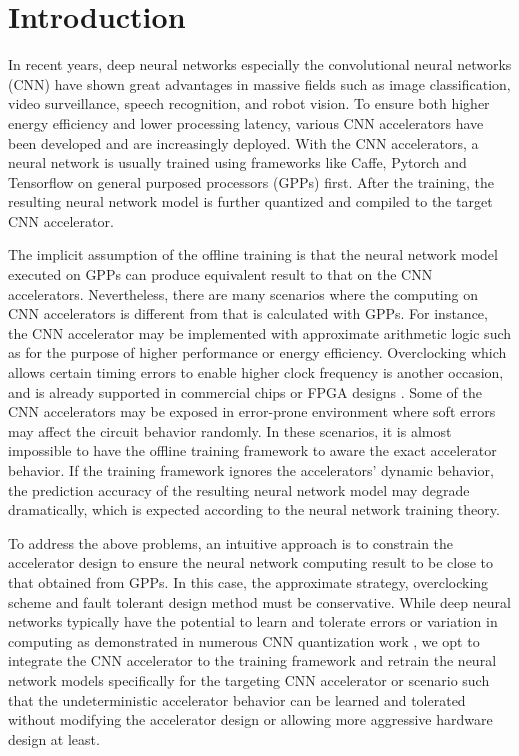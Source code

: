 \section{Introduction} \label{sec:intro}
In recent years, deep neural networks especially the convolutional neural networks (CNN) 
have shown great advantages in massive fields such as image classification, 
video surveillance, speech recognition, and robot vision. To ensure both 
higher energy efficiency and lower processing latency, various CNN accelerators 
\cite{pipecnn_2,Zhang2015_9,Qiu2016_10,deepburing_12,Farabet2010_13,Zeng2018_18} 
have been developed and are increasingly deployed. 
With the CNN accelerators, a neural network is usually trained 
using frameworks like Caffe, Pytorch and Tensorflow on general purposed 
processors (GPPs) first. After the training, the resulting neural network 
model is further quantized and compiled to the target CNN accelerator. 

The implicit assumption of the offline training is that the neural 
network model executed on GPPs can produce equivalent result to 
that on the CNN accelerators. Nevertheless, there are 
many scenarios where the computing on CNN accelerators 
is different from that is calculated with GPPs. For instance, the 
CNN accelerator may be implemented with approximate arithmetic logic 
such as \cite{Approximate_Multiplier_31,Approximate_32,approximate_33} for 
the purpose of higher performance or energy efficiency. 
Overclocking  \cite{overclock_3,Paceline_15,overclock_35} which allows certain 
timing errors to enable higher clock frequency
is another occasion, and is already supported in commercial chips 
or FPGA designs \cite{overclock_retain_34,overclock_Algorithm_36}. Some of the CNN accelerators may be 
exposed in error-prone environment where soft errors 
may affect the circuit behavior randomly. 
In these scenarios, it is almost impossible to have the offline training 
framework to aware the exact accelerator behavior. 
If the training framework ignores the accelerators’ dynamic 
behavior, the prediction accuracy of the resulting neural 
network model may degrade dramatically, which is expected according to 
the neural network training theory.

To address the above problems, an intuitive approach is to 
constrain the accelerator design to ensure the neural 
network computing result to be close to that obtained from GPPs. 
In this case, the approximate strategy, overclocking scheme and 
fault tolerant design method must be conservative. 
While deep neural networks typically have the potential to 
learn and tolerate errors or variation in computing as demonstrated in 
numerous CNN quantization work \cite{Hwang2014_17,Matthieu2014_8}, we opt to 
integrate the CNN accelerator to the training framework 
and retrain the neural network models specifically for the 
targeting CNN accelerator or scenario such that the undeterministic 
accelerator behavior can be learned and tolerated without 
modifying the accelerator design or allowing more aggressive 
hardware design at least. 

